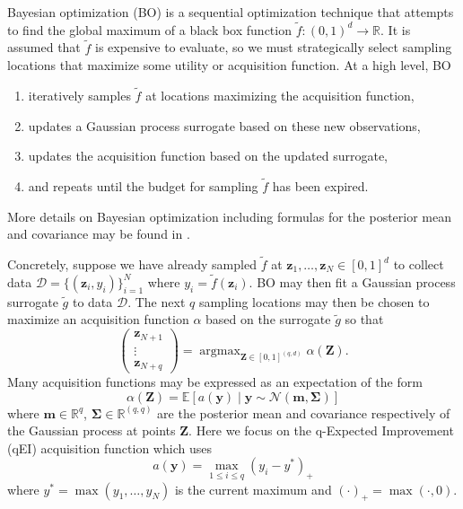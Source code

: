 \documentclass[graybox]{svmult}
\begin{document}
Bayesian optimization (BO) is a sequential optimization technique that attempts to find the global maximum of a black box function $\tilde{f}: (0,1)^{d} \to \mathbb{R}$. It is assumed that $\tilde{f}$ is expensive to evaluate, so we must strategically select sampling locations that maximize some utility or acquisition function. At a high level, BO 
\begin{enumerate}
    \item iteratively samples $\tilde{f}$ at locations maximizing the acquisition function,
    \item updates a Gaussian process surrogate based on these new observations,
    \item updates the acquisition function based on the updated surrogate,
    \item and repeats until the budget for sampling $\tilde{f}$ has been expired.
\end{enumerate}
More details on Bayesian optimization including formulas for the posterior mean and covariance may be found in \cite{frazier2018tutorial}.

Concretely, suppose we have already sampled $\tilde{f}$ at $\boldsymbol{z}_1,\dots,\boldsymbol{z}_{N} \in [0,1]^{d}$ to collect data $\mathcal{D}=\{(\boldsymbol{z}_i,y_i)\}_{i=1}^N$ where $y_i = \tilde{f}(\boldsymbol{z}_i)$. BO may then fit a Gaussian process surrogate $\tilde{g}$ to data $\mathcal{D}$. The next $q$ sampling locations may then be chosen to maximize  an acquisition function $\alpha$ based on the surrogate $\tilde{g}$ so that 
\begin{equation}
    \begin{pmatrix}\boldsymbol{z}_{N+1} \\ \vdots \\ \boldsymbol{z}_{N+q}\end{pmatrix} = \mathop{\text{argmax}}_{\boldsymbol{Z} \in [0,1]^{(q,d)}}\alpha(\boldsymbol{Z}).
    \label{eq:nextq}
\end{equation}
Many acquisition functions may be expressed as an expectation of the form
$$\alpha(\boldsymbol{Z}) = \mathbb{E}\left[a(\boldsymbol{y}) \mid \boldsymbol{y} \sim \mathcal{N}\left(\boldsymbol{m},\boldsymbol{\Sigma}\right)\right]$$
where $\boldsymbol{m} \in \mathbb{R}^{q}$, $\boldsymbol{\Sigma} \in \mathbb{R}^{(q, q)}$ are the posterior mean and covariance respectively of the Gaussian process at points $\boldsymbol{Z}$. Here we focus on the q-Expected Improvement (qEI) acquisition function which uses 
$$a(\boldsymbol{y}) = \max_{1 \leq i \leq q} (y_i - y^*)_+$$
where $y^*= \max\left(y_1,\dots,y_N\right)$ is the current maximum and $(\cdot)_+ = \max(\cdot,0)$. 
\end{document}
